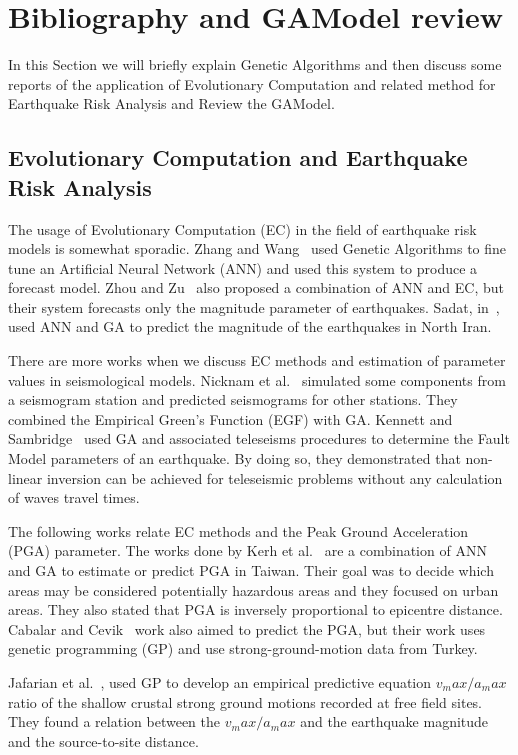 \section{Bibliography and GAModel review}\label{estadoArte}
In this Section we will briefly explain Genetic Algorithms and then discuss some reports of the application of Evolutionary Computation and related method for Earthquake Risk Analysis and Review the GAModel.

\subsection{Evolutionary Computation and Earthquake Risk Analysis}

The usage of Evolutionary Computation (EC) in the field of earthquake risk models is somewhat sporadic. Zhang and Wang~\cite{Zhang2012} used Genetic Algorithms to fine tune an Artificial Neural Network (ANN) and used this system to produce a forecast model. Zhou and Zu~\cite{Feiyan2014} also proposed a combination of ANN and EC, but their system forecasts only the magnitude parameter of earthquakes. Sadat, in~\cite{sadat2015application}, used ANN and GA to predict the magnitude of the earthquakes in North Iran.

There are more works when we discuss EC methods and estimation of parameter values in seismological models. Nicknam et al.~\cite{Nicknam2010} simulated some components from a seismogram station and predicted seismograms for other stations. They combined the Empirical Green’s Function (EGF) with GA. Kennett and Sambridge~\cite{Kennett1992} used GA and associated teleseisms procedures to determine the Fault Model parameters of an earthquake. By doing so, they demonstrated that non-linear inversion can be achieved for teleseismic problems without any calculation of waves travel times. 


The following works relate EC methods and the Peak Ground Acceleration (PGA) parameter. The works done by Kerh et al.~\cite{Kerh2010, Kerh2015} are a combination of ANN and GA to estimate or predict PGA in Taiwan. Their goal was to decide which areas may be considered potentially hazardous areas and they focused on urban areas. They also stated that PGA is inversely proportional to epicentre distance. Cabalar and Cevik~\cite{Cabalar2009} work also aimed to predict the PGA, but their work uses genetic programming (GP) and use strong-ground-motion data from Turkey.

Jafarian et al.~\cite{jafarian2010empirical}, used GP to develop an empirical predictive equation $v_max/a_max$ ratio of the shallow crustal strong ground motions recorded at free field sites. They found a relation between the $v_max/a_max$ and the earthquake magnitude and the source-to-site distance.
 
